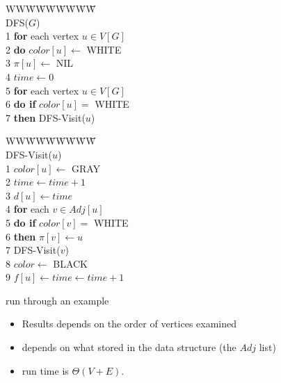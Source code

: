 \documentclass{beamer}
\begin{document}
\begin{frame}{}

\begin{tabbing}
WW\=W\=W\=W\=W\=W\=W\=W\= \kill \\
DFS($G$) \\
1 \> {\bf for} each vertex $u\in V[G]$ \\
2 \>\> {\bf do}\> $color[u]\leftarrow$ WHITE \\
3 \>\>\> $\pi[u]\leftarrow$ NIL \\
4 \> $time \leftarrow 0$ \\
5 \> {\bf for} each vertex $u\in V[G]$ \\
6 \> \> {\bf do if} $color[u]=$ WHITE \\
7 \>\>\> {\bf then} DFS-Visit($u$)
\end{tabbing}
\end{frame}

\begin{frame}{}

\begin{tabbing}
WW\=W\=W\=W\=W\=W\=W\=W\= \kill \\
DFS-Visit($u$) \\
1 \> $color[u]\leftarrow$ GRAY \\
2 \> $time \leftarrow time + 1$ \\
3 \> $d[u]\leftarrow time$ \\
4 \> {\bf for} each $v\in Adj[u]$ \\
5 \> \> {\bf do if} $color[v] = $ WHITE \\
6 \> \>\> {\bf then} $\pi[v]\leftarrow u$ \\
7 \> \>\>\> DFS-Visit($v$) \\ 
8 \> $color\leftarrow$ BLACK \\
9 \> $f[u]\leftarrow time \leftarrow time +1$
\end{tabbing}
run through an example
\end{frame}

\begin{frame}{}

\begin{itemize}
\item Results depends on the order of vertices examined
\item depends on what stored in the data structure (the $Adj$ list)
\item run time is $\Theta(V+E)$.  
\end{itemize}
\end{frame}
\end{document}
